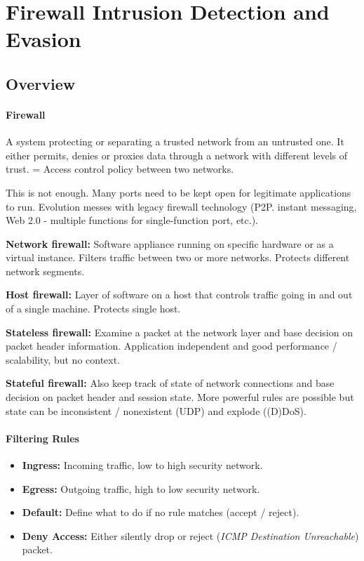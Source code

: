 \section{Firewall Intrusion Detection and Evasion}

\subsection{Overview}

\paragraph{Firewall}
A system protecting or separating a trusted network from an untrusted one. It either permits, denies or proxies data through a network with different levels of trust. = Access control policy between two networks.

This is not enough. Many ports need to be kept open for legitimate applications to run. Evolution messes with legacy firewall technology (P2P. instant messaging, Web 2.0 - multiple functions for single-function port, etc.).

\textbf{Network firewall:} Software appliance running on specific hardware or as a virtual instance. Filters traffic between two or more networks. Protects different network segments.

\textbf{Host firewall:} Layer of software on a host that controls traffic going in and out of a single machine. Protects single host.

\textbf{Stateless firewall:} Examine a packet at the network layer and base decision on packet header information. Application independent and good performance / scalability, but no context.

\textbf{Stateful firewall:} Also keep track of state of network connections and base decision on packet header and session state. More powerful rules are possible but state can be inconsistent / nonexistent (UDP) and explode ((D)DoS).

\paragraph{Filtering Rules}
\begin{itemize}
    \item \textbf{Ingress:} Incoming traffic, low to high security network.
    \item \textbf{Egress:} Outgoing traffic, high to low security network.
    \item \textbf{Default:} Define what to do if no rule matches (accept / reject).
    \item \textbf{Deny Access:} Either silently drop or reject (\textit{ICMP Destination Unreachable}) packet.
\end{itemize}


